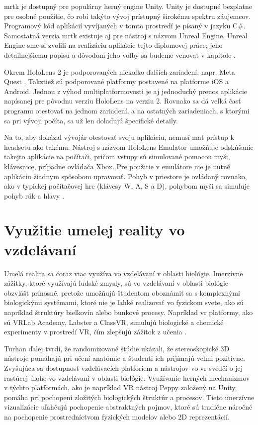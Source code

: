 \acrshort{mrtk} je dostupný pre populárny herný engine Unity. Unity je dostupné bezplatne pre osobné použitie, čo robí takýto vývoj prístupný širokému spektru záujemcov.
Programový kód aplikácií vyvíjaných v tomto prostredí je písaný v jazyku C\#. Samostatná verzia \acrshort{mrtk} existuje aj pre nástroj s názvom Unreal Engine. Unreal
Engine sme si zvolili na realizáciu aplikácie tejto diplomovej práce; jeho detailnejšiemu popisu a dôvodom jeho voľby sa budeme venovať v kapitole .

Okrem HoloLens 2 je podporovaných niekoľko ďalších zariadení, napr. Meta Quest \cite{microsoftWhatMixedReality}. Takztiež sú podporované platformy postavené na platforme
iOS a Android. Jednou z výhod multiplatformovosti je aj jednoduchý prenos aplikácie napísanej pre pôvodnu verziu HoloLens na verziu 2. Rovnako sa dá veľká časť programu
otestovať na jednom zariadení, a na ostatných zariadeniach, s ktorými sa pri vývoji počíta, sa už len dolaďujú špecifické detaily.

Na to, aby dokázal vývojár otestovať svoju aplikáciu, nemusí mať prístup k headsetu ako takému. Nástroj s názvom HoloLens Emulator umožňuje odskúšanie takejto aplikácie 
na počítači, pričom vstupy sú simulované pomocou myši, klávesnice, prípadne ovládača Xbox. Pre použitie v emulátore nie je nutné aplikáciu žiadnym spôsobom upravovať. 
Pohyb v priestore je ovládaný rovnako, ako v typickej počítačovej hre (klávesy W, A, S a D), pohybom myši sa simuluje pohyb rúk a hlavy \cite{microsoftUsingHoloLensEmulator}.

\section{Využitie umelej reality vo vzdelávaní}
Umelá realita sa čoraz viac využíva vo vzdelávaní v oblasti biológie. Imerzívne zážitky, ktoré využívajú ľudské zmysly, sú vo vzdelávaní v oblasti biológie obzvlášť prínosné, 
pretože umožňujú študentom oboznámiť sa s komplexnými biologickými systémami, ktoré nie je ľahké realizovať vo fyzickom svete, ako sú napríklad štruktúry bielkovín alebo bunkové procesy. 
Napríklad \acrshort{vr} platformy, ako sú VRLab Academy, Labster a ClassVR, simulujú biologické a chemické experimenty v prostredí VR, čím zlepšujú zážitok z učenia \cite{turhanBraveNewWorld2022}.

Turhan ďalej tvrdí, že randomizované štúdie ukázali, že stereoskopické 3D nástroje pomáhajú pri učení anatómie a študenti ich prijímajú veľmi pozitívne. Zvyšujúca sa dostupnosť vzdelávacích platforiem 
a nástrojov vo \acrshort{vr} svedčí o jej rastúcej úlohe vo vzdelávaní v oblasti biológie. Využívanie herných mechanizmov v týchto platformách, ako je napríklad VR nástroj Peppy založený na Unity, 
pomáha pri pochopení zložitých biologických štruktúr a procesov. Tieto imerzívne vizualizácie uľahčujú pochopenie abstraktných pojmov, ktoré sú tradične náročné na pochopenie 
prostredníctvom fyzických modelov alebo 2D reprezentácií.

